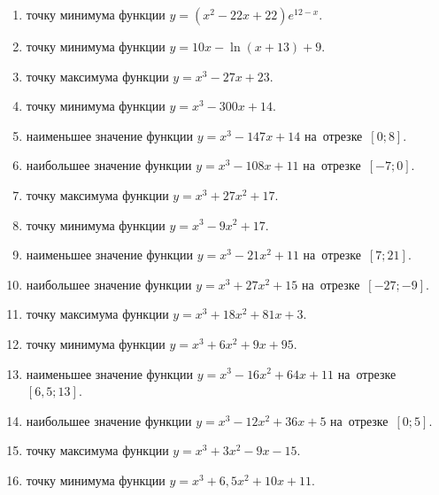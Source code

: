 \documentclass[a4paper,10pt]{article}
\begin{document}
\begin{enumerate}
\item {} точку минимума функции $y=\left(x^2-22x+22\right){{e}^{12-x}}$.

\item {} точку минимума функции $y=10x-\ln \left(x+13\right)+9$.

\item {} точку максимума функции $y=x^3 -27x +23$.

\item {} точку минимума функции $y=x^3 -300x+14$.

\item {} наименьшее значение функции $y=x^3 -147x+14$ на~отрезке~$\left[0;8\right]$.

\item {} наибольшее значение функции $y=x^3 -108x+11$ на~отрезке~$\left[-7;0\right]$.

\item {} точку максимума функции $y=x^3 +27x^2+17$.

\item {} точку минимума функции $y=x^3 -9x^2+17$.

\item {} наименьшее значение функции $y=x^3 -21x^2+11$ на~отрезке~$\left[7;21\right]$.

\item {} наибольшее значение функции $y=x^3 +27x^2+15$ на~отрезке~$\left[-27;-9\right]$.

\item {} точку максимума функции $y=x^3 +18x^2+81x+3$.

\item {} точку минимума функции $y=x^3 +6x^2+9x+95$.

\item {} наименьшее значение функции $y=x^3 -16x^2+64x+11$ на~отрезке~$\left[6,5;13\right]$.

\item {} наибольшее значение функции $y=x^3 -12x^2+36x+5$ на~отрезке~$\left[0;5\right]$.

\item {} точку максимума функции $y=x^3 +3x^2-9x-15$.

\item {} точку минимума функции $y=x^3 +6,5x^2+10x+11$.


\end{enumerate}
\end{document}
